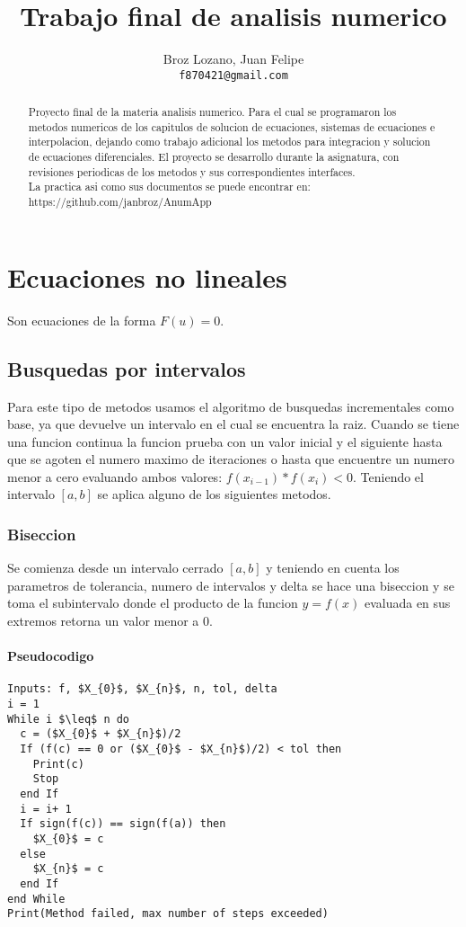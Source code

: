 \documentclass[11pt]{article}
\author{
  Broz Lozano, Juan Felipe\\
  \texttt{f870421@gmail.com}
}
\title{Trabajo final de analisis numerico}
\begin{document}
\maketitle

\begin{abstract}
  Proyecto final de la materia analisis numerico. Para el cual se programaron los metodos numericos de los capitulos de solucion de ecuaciones, sistemas de ecuaciones e interpolacion, dejando como trabajo adicional los metodos para integracion y solucion de ecuaciones diferenciales. El proyecto se desarrollo durante la asignatura, con revisiones periodicas de los metodos y sus correspondientes interfaces.\\
  La practica asi como sus documentos se puede encontrar en:\\ https://github.com/janbroz/AnumApp
\end{abstract}


\newpage
\section{Ecuaciones no lineales}
Son ecuaciones de la forma $F(u) = 0$. 

\subsection{Busquedas por intervalos}
Para este tipo de metodos usamos el algoritmo de busquedas incrementales como base, ya que devuelve un intervalo en el cual se encuentra la raiz. Cuando se tiene una funcion continua la funcion prueba con un valor inicial y el siguiente hasta que se agoten el numero maximo de iteraciones o hasta que encuentre un numero menor a cero evaluando ambos valores: $f(x_{i-1}) * f(x_{i}) < 0$.
Teniendo el intervalo $[a,b]$ se aplica alguno de los siguientes metodos.

\subsubsection{Biseccion}
Se comienza desde un intervalo cerrado $[a,b]$ y teniendo en cuenta los parametros de tolerancia, numero de intervalos y delta se hace una biseccion y se toma el subintervalo donde el producto de la funcion $y = f(x)$ evaluada en sus extremos retorna un valor menor a 0.
\paragraph{Pseudocodigo\\}
\begin{lstlisting}[frame=single, mathescape=true]
Inputs: f, $X_{0}$, $X_{n}$, n, tol, delta
i = 1
While i $\leq$ n do         
  c = ($X_{0}$ + $X_{n}$)/2      
  If (f(c) == 0 or ($X_{0}$ - $X_{n}$)/2) < tol then 
    Print(c)
    Stop
  end If
  i = i+ 1                                                         
  If sign(f(c)) == sign(f(a)) then 
    $X_{0}$ = c 
  else
    $X_{n}$ = c
  end If
end While
Print(Method failed, max number of steps exceeded)
\end{lstlisting}
\end{document}
